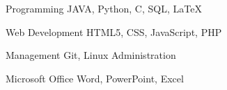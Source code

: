 

\begin{cvskills}

  \cvskill
    {Programming} %
    { JAVA, Python, C, SQL, LaTeX} %

  \cvskill
    {Web Development} %
    {HTML5, CSS, JavaScript, PHP} %

  \cvskill
    {Management} %
    {Git, Linux Administration} %

  \cvskill
    {Microsoft Office} %
    {Word, PowerPoint, Excel} %

\end{cvskills}
